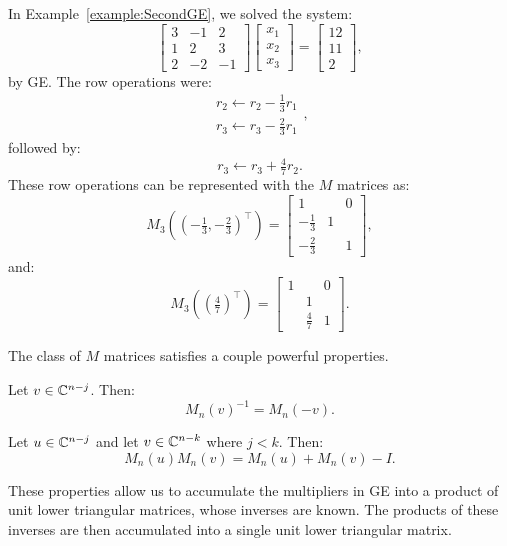 \begin{example}
In Example~\ref{example:SecondGE}, we solved the system:
\[
\begin{bmatrix} 3 & -1 & 2\\ 1 & 2 & 3\\ 2 & -2 & -1\end{bmatrix}\begin{bmatrix} x_1\\x_2\\x_3\end{bmatrix} = \begin{bmatrix}12\\11\\2\end{bmatrix},
\]
by GE. The row operations were:
\[
\begin{array}{c} r_2 \leftarrow r_2 - \frac{1}{3}r_1\\ r_3 \leftarrow r_3 - \frac{2}{3} r_1\end{array},
\]
followed by:
\[
r_3 \leftarrow r_3 + \tfrac{4}{7}r_2.
\]
These row operations can be represented with the $M$ matrices as:
\[
M_3((-\tfrac{1}{3},-\tfrac{2}{3})^\top) = \begin{bmatrix} 1 & & 0\\ -\frac{1}{3} & 1\\ -\frac{2}{3} & & 1\end{bmatrix},
\]
and:
\[
M_3((\tfrac{4}{7})^\top) = \begin{bmatrix} 1 & & 0\\ & 1\\ & \frac{4}{7} & 1\end{bmatrix}.
\]
\end{example}

The class of $M$ matrices satisfies a couple powerful properties.

\begin{lemma}\label{lemma:MinverseLU} Let $v\in\mathbb{C}^{n-j}$. Then:
\begin{equation}
M_n(v)^{-1} = M_n(-v).
\end{equation}
\end{lemma}

\begin{lemma}\label{lemma:MuMv} Let $u\in\mathbb{C}^{n-j}$ and let $v\in\mathbb{C}^{n-k}$ where $j<k$. Then:
\begin{equation}
M_n(u)M_n(v) = M_n(u)+M_n(v)-I.
\end{equation}
\end{lemma}

These properties allow us to accumulate the multipliers in GE into a product of unit lower triangular matrices, whose inverses are known. The products of these inverses are then accumulated into a single unit lower triangular matrix.

